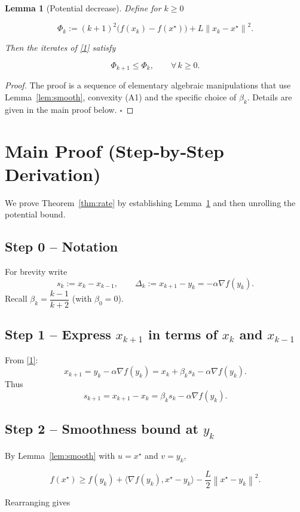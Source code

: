 \documentclass{article}
\newtheorem{lemma}{Lemma}
\newcommand{\grad}{\nabla}
\newcommand{\norm}[1]{\left\|#1\right\|}
\begin{document}
\begin{lemma}[Potential decrease]\label{lem:potential}
Define for \(k\ge 0\)

\[
\Phi_k := (k+1)^{2}\bigl(f(x_k)-f(x^{\star})\bigr)
            +L\norm{x_k-x^{\star}}^{2}.
\tag{L2}
\]

Then the iterates of \eqref{1} satisfy  

\[
\Phi_{k+1}\le \Phi_k,\qquad\forall\,k\ge 0.
\tag{L3}
\]
\end{lemma}
\begin{proof}
The proof is a sequence of elementary algebraic manipulations that
use Lemma~\ref{lem:smooth}, convexity (A1) and the specific choice of
\(\beta_k\). Details are given in the main proof below. \hfill\(\square\)
\end{proof}

\newpage
\section*{Main Proof (Step‑by‑Step Derivation)}
We prove Theorem~\ref{thm:rate} by establishing Lemma~\ref{lem:potential}
and then unrolling the potential bound.

\subsection*{Step 0 – Notation}
For brevity write
\[
s_k:=x_k-x_{k-1},\qquad
\Delta_k:=x_{k+1}-y_k = -\alpha\grad f(y_k).
\]
Recall \(\beta_k=\dfrac{k-1}{k+2}\) (with \(\beta_0=0\)).

\subsection*{Step 1 – Express \(x_{k+1}\) in terms of \(x_k\) and \(x_{k-1}\)}
From \eqref{1}:
\[
x_{k+1}=y_k-\alpha\grad f(y_k)
      =x_k+\beta_k s_k-\alpha\grad f(y_k).
\tag{1.1}
\]
Thus
\[
s_{k+1}=x_{k+1}-x_k = \beta_k s_k-\alpha\grad f(y_k).
\tag{1.2}
\]

\subsection*{Step 2 – Smoothness bound at \(y_k\)}
By Lemma~\ref{lem:smooth} with \(u=x^{\star}\) and \(v=y_k\),

\[
f(x^{\star})\ge f(y_k)+\langle \grad f(y_k),x^{\star}-y_k\rangle
               -\frac{L}{2}\norm{x^{\star}-y_k}^{2}.
\tag{2.1}
\]

Rearranging gives
\end{document}
